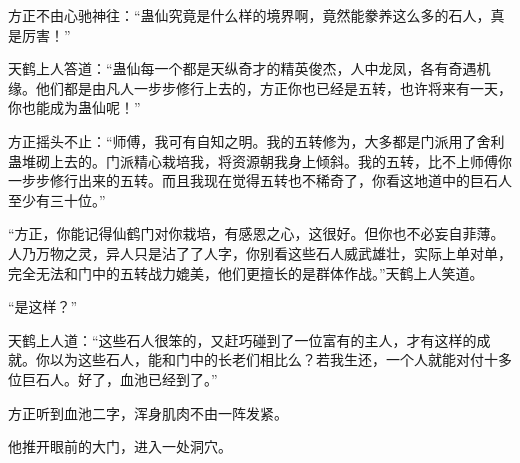 \begin{this_body}
方正不由心驰神往：“蛊仙究竟是什么样的境界啊，竟然能豢养这么多的石人，真是厉害！”

天鹤上人答道：“蛊仙每一个都是天纵奇才的精英俊杰，人中龙凤，各有奇遇机缘。他们都是由凡人一步步修行上去的，方正你也已经是五转，也许将来有一天，你也能成为蛊仙呢！”

方正摇头不止：“师傅，我可有自知之明。我的五转修为，大多都是门派用了舍利蛊堆砌上去的。门派精心栽培我，将资源朝我身上倾斜。我的五转，比不上师傅你一步步修行出来的五转。而且我现在觉得五转也不稀奇了，你看这地道中的巨石人至少有三十位。”

“方正，你能记得仙鹤门对你栽培，有感恩之心，这很好。但你也不必妄自菲薄。人乃万物之灵，异人只是沾了了人字，你别看这些石人威武雄壮，实际上单对单，完全无法和门中的五转战力媲美，他们更擅长的是群体作战。”天鹤上人笑道。

“是这样？”

天鹤上人道：“这些石人很笨的，又赶巧碰到了一位富有的主人，才有这样的成就。你以为这些石人，能和门中的长老们相比么？若我生还，一个人就能对付十多位巨石人。好了，血池已经到了。”

方正听到血池二字，浑身肌肉不由一阵发紧。

他推开眼前的大门，进入一处洞穴。

\end{this_body}

